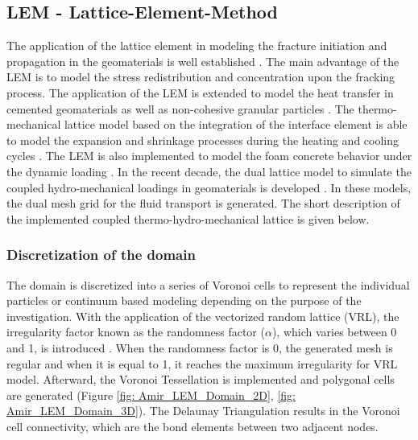 \subsection{LEM - Lattice-Element-Method}

The application of the lattice element in modeling the fracture initiation and propagation in the geomaterials is well established \cite{Liuetal2007, Pradoetal2003, Vanmieretal2002}. The main advantage of the LEM is to model the stress redistribution and concentration upon the fracking process. The application of the LEM is extended to model the heat transfer in cemented geomaterials \cite{Sattarietal2017} as well as non-cohesive granular particles \cite{Rizvietal2018b}. The thermo-mechanical lattice model based on the integration of the interface element is able to model the expansion and shrinkage processes during the heating and cooling cycles \cite{Sattarietal2019b}. The LEM is also implemented to model the foam concrete behavior under the dynamic loading \cite{Rizvietal2018a}. In the recent decade, the dual lattice model to simulate the coupled hydro-mechanical loadings in geomaterials is developed \cite{Grassl2009}. In these models, the dual mesh grid for the fluid transport is generated. The short description of the implemented coupled thermo-hydro-mechanical lattice is given below.

\subsubsection*{Discretization of the domain}

The domain is discretized into a series of Voronoi cells to represent the individual particles or continuum based modeling depending on the purpose of the investigation. With the application of the vectorized random lattice (VRL), the irregularity factor known as the randomness factor ($\alpha$), which varies between 0 and 1, is introduced \cite{Moukarzeletal1992}. When the randomness factor is 0, the generated mesh is regular and when it is equal to 1, it reaches the maximum irregularity for VRL model.  Afterward, the Voronoi Tessellation is implemented and polygonal cells are generated (Figure \ref{fig: Amir_LEM_Domain_2D}, \ref{fig: Amir_LEM_Domain_3D}). The Delaunay Triangulation results in the Voronoi cell connectivity, which are the bond elements between two adjacent nodes. 

